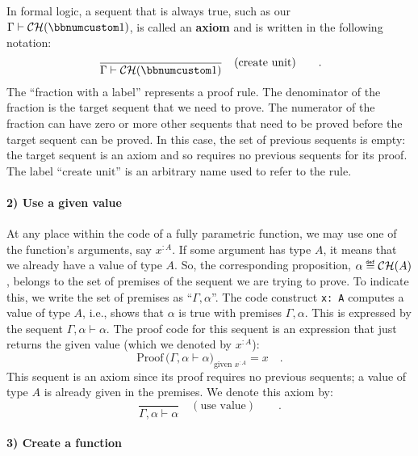 In formal logic, a sequent that is always true, such as our $\Gamma\vdash{\cal CH}(\bbnum 1)$,
is called an \textbf{axiom} and is written in
the following notation:
\[
\frac{}{\Gamma\vdash{\cal CH}(\bbnum 1)}\quad(\text{create unit})\quad\quad.
\]
The \textsf{``}fraction with a label\textsf{''} represents a proof rule. The denominator
of the fraction is the target sequent that we need to prove. The numerator
of the fraction can have zero or more other sequents that need to
be proved before the target sequent can be proved. In this case, the
set of previous sequents is empty: the target sequent is an axiom
and so requires no previous sequents for its proof. The label \textsf{``}$\text{create unit}$\textsf{''}
is an arbitrary name used to refer to the rule.

\paragraph{2) Use a given value}

At any place within the code of a fully parametric function, we may
use one of the function\textsf{'}s arguments, say $x^{:A}$. If some argument
has type $A$, it means that we already have a value of type $A$.
So, the corresponding proposition, $\alpha\triangleq{\cal CH}(A)$,
belongs to the set of premises of the sequent we are trying to prove.
To indicate this, we write the set of premises as \textsf{``}$\Gamma,\alpha$\textsf{''}.
The code construct \lstinline!x: A! computes a value of type $A$,
i.e., shows that $\alpha$ is true with premises $\Gamma,\alpha$.
This is expressed by the sequent $\Gamma,\alpha\vdash\alpha$. The
proof code for this sequent is an expression that just returns the
given value (which we denoted by $x^{:A}$):
\[
\text{Proof}\,\big(\Gamma,\alpha\vdash\alpha\big)_{\text{given }x^{:A}}=x\quad.
\]
This sequent is an axiom since its proof requires no previous sequents;
a value of type $A$ is already given in the premises. We denote this
axiom by:
\[
\frac{~}{\Gamma,\alpha\vdash\alpha}\quad(\text{use value})\quad\quad.
\]


\paragraph{3) Create a function}

